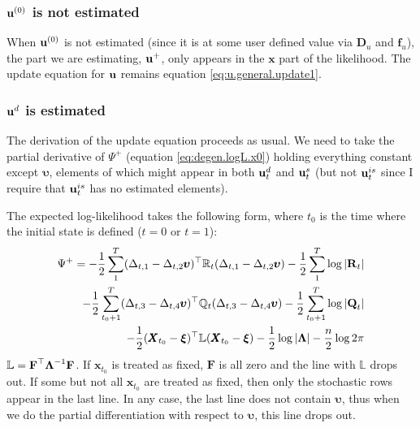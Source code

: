 \documentclass[]{article}
\def\uupsilon{\pmb{\upsilon}}
\def\xixi{\mbox{\boldmath $\xi$}}
\def\LAM{\mbox{\boldmath $\Lambda$}}
\def\LAMm{\mathbb{L}}
\def\DD{\mbox{$\mathbf D$}}	\def\dd{\mbox{$\mathbf d$}}
\def\FF{\mbox{$\mathbf F$}} \def\ff{\mbox{$\mathbf f$}}
\def\QQ{\mbox{$\mathbf Q$}}	 \def\qq{\mbox{$\mathbf q$}}
\def\RR{\mbox{$\mathbf R$}}	 \def\rr{\mbox{$\mathbf r$}}
\def\XX{\mbox{$\pmb{X}$}}	\def\xx{\mbox{$\pmb{x}$}}
\begin{document}
\subsubsection{$\mbox{$\mathbf u$}^{(0)}$ is not estimated}
When $\mbox{$\mathbf u$}^{(0)}$ is not estimated (since it is at some user defined value via $\DD_u$ and $\ff_u$), the part we are estimating, $\mbox{$\mathbf u$}^+$, only appears in the $\xx$ part of the likelihood. The update equation for $\mbox{$\mathbf u$}$ remains equation \ref{eq:u.general.update1}.

\subsubsection{$\mbox{$\mathbf u$}^d$ is estimated}
The derivation of the update equation proceeds as usual.  We need to take the partial derivative of $\Psi^+$ (equation \ref{eq:degen.logL.x0}) holding everything constant except $\uupsilon$, elements of which might appear in both $\mbox{$\mathbf u$}_t^d$ and $\mbox{$\mathbf u$}_t^s$ (but not $\mbox{$\mathbf u$}_t^{is}$ since I require that $\mbox{$\mathbf u$}_t^{is}$ has no estimated elements). 

The expected log-likelihood takes the following form, where $t_0$ is the time where the initial state is defined ($t=0$ or $t=1$):
\begin{equation}\label{eq:degen.logL.u}
\begin{split}
\Psi^+ =  
-\frac{1}{2}\sum_1^T (\Delta_{t,1} - \Delta_{t,2}\pmb{\upsilon})^\top\Rm_t(\Delta_{t,1} - \Delta_{t,2}\pmb{\upsilon}) - \frac{1}{2}\sum_1^T\log |\RR_t| \\
-\frac{1}{2}\sum_{t_0+1}^T (\Delta_{t,3} - \Delta_{t,4}\pmb{\upsilon})^\top\Qm_t(\Delta_{t,3} - \Delta_{t,4}\pmb{\upsilon}) - \frac{1}{2}\sum_{t_0+1}^T\log |\QQ_t| \\
- \frac{1}{2}(\XX_{t_0} - \xixi)^\top \LAMm(\XX_{t_0} - \xixi) - \frac{1}{2}\log |\LAM| - \frac{n}{2}\log 2\pi \\
\end{split}
\end{equation}
$\LAMm=\FF^\top\LAM^{-1}\FF$.  If $\xx_{t_0}$ is treated as fixed, $\FF$ is all zero and the line with $\LAMm$ drops out.  If some but not all $\xx_{t_0}$ are treated as fixed, then only the stochastic rows appear in the last line.  In any case, the last line does not contain $\uupsilon$, thus when we do the partial differentiation with respect to $\uupsilon$, this line drops out. 
\end{document}
